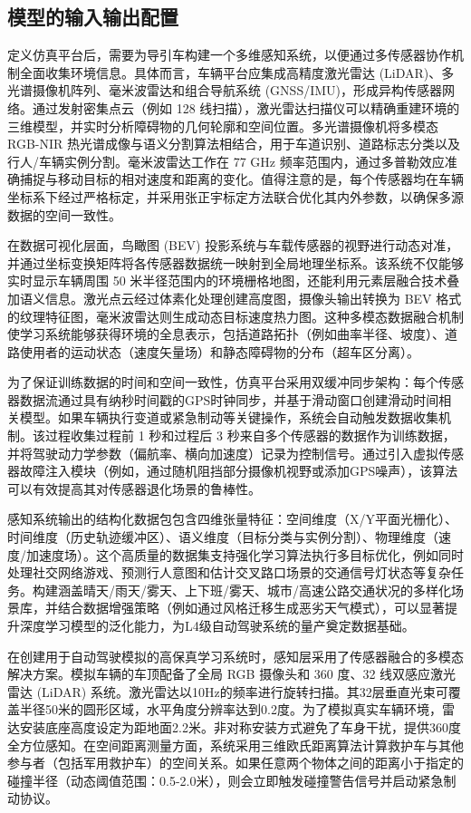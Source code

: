\subsection{模型的输入输出配置 }

定义仿真平台后，需要为导引车构建一个多维感知系统，以便通过多传感器协作机制全面收集环境信息。具体而言，车辆平台应集成高精度激光雷达 (LiDAR)、多光谱摄像机阵列、毫米波雷达和组合导航系统 (GNSS/IMU)，形成异构传感器网络。通过发射密集点云（例如 128 线扫描），激光雷达扫描仪可以精确重建环境的三维模型，并实时分析障碍物的几何轮廓和空间位置。多光谱摄像机将多模态 RGB-NIR 热光谱成像与语义分割算法相结合，用于车道识别、道路标志分类以及行人/车辆实例分割。毫米波雷达工作在 77 GHz 频率范围内，通过多普勒效应准确捕捉与移动目标的相对速度和距离的变化。值得注意的是，每个传感器均在车辆坐标系下经过严格标定，并采用张正宇标定方法联合优化其内外参数，以确保多源数据的空间一致性。

在数据可视化层面，鸟瞰图 (BEV) 投影系统与车载传感器的视野进行动态对准，并通过坐标变换矩阵将各传感器数据统一映射到全局地理坐标系。该系统不仅能够实时显示车辆周围 50 米半径范围内的环境栅格地图，还能利用元素层融合技术叠加语义信息。激光点云经过体素化处理创建高度图，摄像头输出转换为 BEV 格式的纹理特征图，毫米波雷达则生成动态目标​​速度热力图。这种多模态数据融合机制使学习系统能够获得环境的全息表示，包括道路拓扑（例如曲率半径、坡度）、道路使用者的运动状态（速度矢量场）和静态障碍物的分布（超车区分离）。

为了保证训练数据的时间和空间一致性，仿真平台采用双缓冲同步架构：每个传感器数据流通过具有纳秒时间戳的GPS时钟同步，并基于滑动窗口创建滑动时间相关模型。如果车辆执行变道或紧急制动等关键操作，系统会自动触发数据收集机制。该过程收集过程前 1 秒和过程后 3 秒来自多个传感器的数据作为训练数据，并将驾驶动力学参数（偏航率、横向加速度）记录为控制信号。通过引入虚拟传感器故障注入模块（例如，通过随机阻挡部分摄像机视野或添加GPS噪声），该算法可以有效提高其对传感器退化场景的鲁棒性。

感知系统输出的结构化数据包包含四维张量特征：空间维度（X/Y平面光栅化）、时间维度（历史轨迹缓冲区）、语义维度（目标分类与实例分割）、物理维度（速度/加速度场）。这个高质量的数据集支持强化学习算法执行多目标优化，例如同时处理社交网络游戏、预测行人意图和估计交叉路口场景的交通信号灯状态等复杂任务。构建涵盖晴天/雨天/雾天、上下班/雾天、城市/高速公路交通状况的多样化场景库，并结合数据增强策略（例如通过风格迁移生成恶劣天气模式），可以显著提升深度学习模型的泛化能力，为L4级自动驾驶系统的量产奠定数据基础。

在创建用于自动驾驶模拟的高保真学习系统时，感知层采用了传感器融合的多模态解决方案。模拟车辆的车顶配备了全局 RGB 摄像头和 360 度、32 线双感应激光雷达 (LiDAR) 系统。激光雷达以10Hz的频率进行旋转扫描。其32层垂直光束可覆盖半径50米的圆形区域，水平角度分辨率达到0.2度。为了模拟真实车辆环境，雷达安装底座高度设定为距地面2.2米。非对称安装方式避免了车身干扰，提供360度全方位感知。在空间距离测量方面，系统采用三维欧氏距离算法计算救护车与其他参与者（包括军用救护车）的空间关系。如果任意两个物体之间的距离小于指定的碰撞半径（动态阈值范围：0.5-2.0米），则会立即触发碰撞警告信号并启动紧急制动协议。

